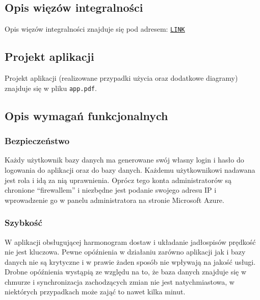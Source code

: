 \documentclass[12pt]{article}
\newcommand{\quotes}[1]{``#1''}
\begin{document}
\subsection{Opis więzów integralności}
\noindent Opis więzów integralności znajduje się pod adresem: \texttt{\href{https://wutwaw-my.sharepoint.com/:x:/g/personal/01143627_pw_edu_pl/ESLyg2i21LRBgUp8RWfRSLgB-xCOXny2bD24kXWuZf6KzA?rtime=QEzI1x4e2Ug}{LINK}}

\subsection{Projekt aplikacji}

\noindent Projekt aplikacji (realizowane przypadki użycia oraz dodatkowe diagramy) znajduje się w pliku \texttt{app.pdf}.

\subsection{Opis wymagań funkcjonalnych}

\subsubsection{Bezpieczeństwo}
Każdy użytkownik bazy danych ma generowane swój własny login i hasło do logowania do aplikacji oraz do bazy danych. Każdemu użytkownikowi nadawana jest rola i idą za nią uprawnienia. Oprócz tego konta administratorów są chronione \quotes{firewallem} i niezbędne jest podanie swojego adresu IP i wprowadzenie go w panelu administratora na stronie Microsoft Azure.

\subsubsection{Szybkość}
W aplikacji obsługującej harmonogram dostaw i układanie jadłospisów prędkość nie jest kluczowa. Pewne opóźnienia w działaniu zarówno aplikacji jak i bazy danych nie są krytyczne i w prawie żaden sposób nie wpływają na jakość usługi. Drobne opóźnienia wystąpią ze względu na to, że baza danych znajduje się w chmurze i synchronizacja zachodzących zmian nie jest natychmiastowa, w niektórych przypadkach może zająć to nawet kilka minut.
\end{document}
